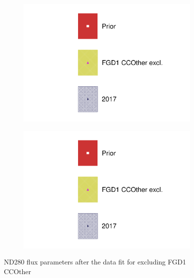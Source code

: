 \begin{figure}[h]
\begin{subfigure}[t]{0.24\textwidth}
		\includegraphics[width=\textwidth, trim={0mm 0mm 0mm 0mm}, clip,page=8]{figures/mach3/data/alt/2017b_NoFGD1CCOth_Data_merg_2017b_NewData_NewDet_UpdXsecStep_2Xsec_4Det_5Flux_0}
	\end{subfigure}
	\begin{subfigure}[t]{0.24\textwidth}
		\includegraphics[width=\textwidth, trim={0mm 0mm 0mm 0mm}, clip,page=9]{figures/mach3/data/alt/2017b_NoFGD1CCOth_Data_merg_2017b_NewData_NewDet_UpdXsecStep_2Xsec_4Det_5Flux_0}
	\end{subfigure}
	\caption{ND280 flux parameters after the data fit for excluding FGD1 CCOther}
	\label{fig:flux_data_nd280_nofgd1ccoth}
\end{figure}


